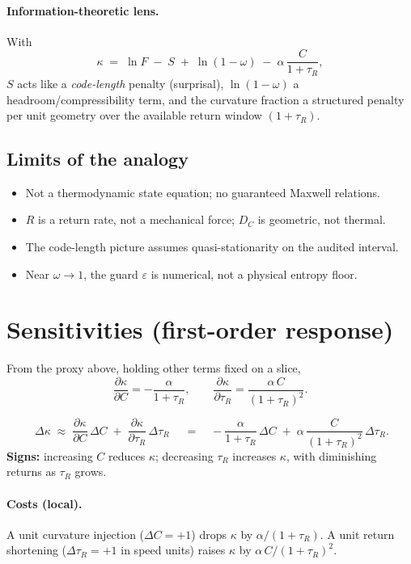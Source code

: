 \paragraph{Information-theoretic lens.}
With
\[
\kappa \;=\; \ln F \;-\; S \;+\; \ln(1-\omega) \;-\; \alpha\,\frac{C}{1+\tau_{R}},
\]
$S$ acts like a \emph{code-length} penalty (surprisal), $\ln(1-\omega)$ a headroom/compressibility term, and the curvature fraction a structured penalty per unit geometry over the available return window $(1+\tau_R)$.

\subsection*{Limits of the analogy}
\begin{itemize}[leftmargin=1.8em]
  \item Not a thermodynamic state equation; no guaranteed Maxwell relations.
  \item $R$ is a return rate, not a mechanical force; $D_C$ is geometric, not thermal.
  \item The code-length picture assumes quasi-stationarity on the audited interval.
  \item Near $\omega\to1$, the guard $\varepsilon$ is numerical, not a physical entropy floor.
\end{itemize}

\section{Sensitivities (first-order response)}
From the proxy above, holding other terms fixed on a slice,
\[
\frac{\partial \kappa}{\partial C} = -\frac{\alpha}{1+\tau_{R}}, 
\qquad
\frac{\partial \kappa}{\partial \tau_{R}} = \frac{\alpha\,C}{(1+\tau_{R})^{2}}.
\]

\begin{eqbox}
\[
\boxed{\;\Delta \kappa \;\approx\; 
\frac{\partial \kappa}{\partial C}\,\Delta C \;+\;
\frac{\partial \kappa}{\partial \tau_{R}}\,\Delta \tau_{R}\;}
\quad=\quad
-\frac{\alpha}{1+\tau_{R}}\,\Delta C \;+\; \alpha\,\frac{C}{(1+\tau_{R})^{2}}\,\Delta \tau_{R}.
\]
\textbf{Signs:} increasing $C$ reduces $\kappa$; decreasing $\tau_R$ increases $\kappa$, with diminishing returns as $\tau_R$ grows.
\end{eqbox}

\paragraph{Costs (local).}
A unit curvature injection ($\Delta C=+1$) drops $\kappa$ by $\alpha/(1+\tau_R)$. A unit return shortening ($\Delta\tau_R=+1$ in speed units) raises $\kappa$ by $\alpha\,C/(1+\tau_R)^2$.

